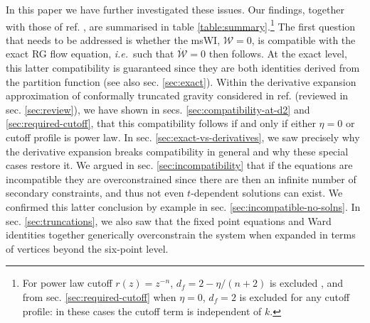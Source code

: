 \documentclass[11pt,a4paper]{article}
\numberwithin{figure}{section}
\numberwithin{equation}{section}
\newcommand\ie{\textit{i.e.}\ }
\begin{document}
In this paper we have further investigated these issues. Our findings, together with those of ref. \cite{Dietz:2015owa}, are summarised in table \ref{table:summary}.\footnote{For power law cutoff  $r(z)=z^{-n}$, $d_f = 2-\eta/(n+2)$ is excluded \cite{Dietz:2015owa}, and from sec. \ref{sec:required-cutoff} when $\eta=0$,  $d_f=2$ is excluded for any cutoff profile: in these cases the cutoff term is independent of $k$.} The first question that needs to be addressed is whether the msWI, $\mathcal{W}=0$, is compatible with the exact RG flow equation, \ie such that $\dot{\mathcal{W}}=0$ then follows. At the exact level, this latter compatibility is guaranteed since they are both identities derived from the partition function (see also sec. \ref{sec:exact}). Within the derivative expansion approximation of conformally truncated gravity considered in ref. \cite{Dietz:2015owa} (reviewed in sec. \ref{sec:review}), we have shown  in secs. \ref{sec:compatibility-at-d2} and \ref{sec:required-cutoff}, that this compatibility follows if and only if either $\eta=0$ or cutoff profile is power law. In sec. \ref{sec:exact-vs-derivatives}, we saw precisely why the derivative expansion breaks compatibility in general and why these special cases restore it. We argued in sec. \ref{sec:incompatibility} that if the equations are incompatible they are overconstrained since there are then an infinite number of secondary constraints, and thus not even $t$-dependent solutions can exist. We confirmed this latter conclusion by example in sec. \ref{sec:incompatible-no-solns}. In sec. \ref{sec:truncations}, we also saw that the fixed point equations and Ward identities together generically overconstrain the system when expanded in terms of vertices beyond the six-point level.

\end{document}
